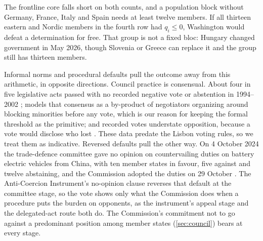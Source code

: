 The frontline core falls short on both counts, and a population block without Germany, France, Italy and Spain needs at least twelve members. If all thirteen eastern and Nordic members in the fourth row had $q_i\le0$, Washington would defeat a determination for free. That group is not a fixed bloc: Hungary changed government in May 2026, though Slovenia or Greece can replace it and the group still has thirteen members.

Informal norms and procedural defaults pull the outcome away from this arithmetic, in opposite directions. Council practice is consensual. About four in five legislative acts passed with no recorded negative vote or abstention in 1994--2002 \citep{heisenberg2005institution}; \citet{hage2013coalition} models that consensus as a by-product of negotiators organizing around blocking minorities before any vote, which is our reason for keeping the formal threshold as the primitive; and recorded votes understate opposition, because a vote would disclose who lost \citep{novak2013silence}. These data predate the Lisbon voting rules, so we treat them as indicative. Reversed defaults pull the other way. On 4 October 2024 the trade-defence committee gave no opinion on countervailing duties on battery electric vehicles from China, with ten member states in favour, five against and twelve abstaining, and the Commission adopted the duties on 29 October \citep{afp2024bev, ec2024bev, eu2011comitology}. The Anti-Coercion Instrument's no-opinion clause reverses that default at the committee stage, so the vote shows only what the Commission does when a procedure puts the burden on opponents, as the instrument's appeal stage and the delegated-act route both do. The Commission's commitment not to go against a predominant position among member states (\cref{sec:council}) bears at every stage.
